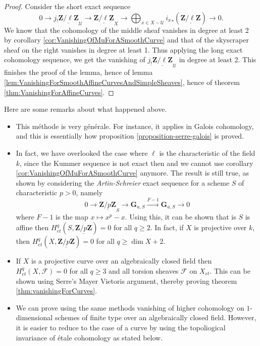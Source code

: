 \begin{proof}
Consider the short exact sequence
$$
0 \longrightarrow j_!\underline{\mathbf{Z}/\ell\mathbf{Z}}_\mathcal{U} 
\longrightarrow \underline{\mathbf{Z}/\ell\mathbf{Z}}_X \longrightarrow 
\bigoplus_{x \in X-\mathcal{U}} {i_x}_*(\underline{\mathbf{Z}/\ell\mathbf{Z}}) 
\longrightarrow 0.
$$
We know that the cohomology of the middle sheaf vanishes in degree at least 2 
by corollary \ref{cor:VanishingOfMuForASmoothCurve} and that of the skyscraper 
sheaf on the right vanishes in degree at least 1. Thus applying the long exact 
cohomology sequence, we get the vanishing of 
$j_!\underline{\mathbf{Z}/\ell\mathbf{Z}}_\mathcal{U}$ in degree at least 2. 
This finishes the proof of the lemma, hence of lemma 
\ref{lem:VanishingForSmoothAffineCurvesAndSimpleSheaves}, hence of theorem 
\ref{thm:VanishingForAffineCurves}.
\end{proof}


\begin{remark}
Here are some remarks about what happened above.
\begin{itemize}
\item 
This m\'ethode is very g\'en\'erale. For instance, it applies in Galois 
cohomology, and this is essentially how proposition \ref{proposition-serre-galois} is 
proved.
\item
In fact, we have overlooked the case where $\ell$ is the characteristic of the 
field $k$, since the Kummer sequence is not exact then and we cannot use 
corollary \ref{cor:VanishingOfMuForASmoothCurve} anymore. The result is still 
true, as shown by considering the {\it Artin-Schreier} exact sequence for a 
scheme $S$ of characteristic $p >0$, namely
$$
0 \longrightarrow \underline{\mathbf{Z}/p\mathbf{Z}}_S \longrightarrow 
\mathbf{G}_{a,S} \xrightarrow{F-1} \mathbf{G}_{a,S} \longrightarrow 0
$$
where $F-1$ is the map $x \mapsto x^p - x$. Using this, it can be shown that is 
$S$ is affine then $H_{et}^q(S,\underline{\mathbf{Z}/p\mathbf{Z}}) = 0$ for all 
$q \geq 2$. In fact, if $X$ is projective over $k$, then 
$H_{et}^q(X,\underline{\mathbf{Z}/p\mathbf{Z}}) = 0$ for all $q \geq \dim X+2$.
\item
If $X$ is a projective curve over an algebraically closed field then 
$H_{et}^q(X,\mathcal{F}) = 0$ for all $q \geq 3$ and all torsion sheaves 
$\mathcal{F}$ on $X_{et}$. This can be shown using Serre's Mayer Vietoris 
argument, thereby proving theorem \ref{thm:vanishingForCurves}.
\item We can prove using the same methods vanishing of higher cohomology
on $1$-dimensional schemes of finite type over an algebraically closed field.
However, it is easier to reduce to the case of a curve by using the
topoliogical invariance of \'etale cohomology as stated below.
\end{itemize}
\end{remark}


